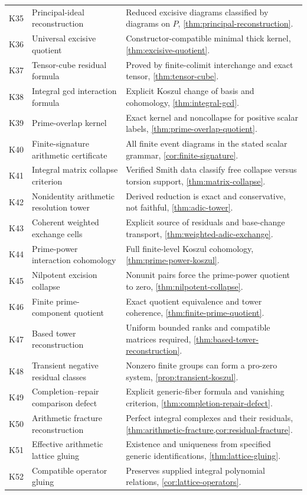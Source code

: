 \documentclass[11pt]{article}
\theoremstyle{definition}
\theoremstyle{remark}
\begin{document}
\begin{longtable}{>{\raggedright\arraybackslash}p{} >{\raggedright\arraybackslash}p{} >{\raggedright\arraybackslash}p{}}
K35 & Principal-ideal reconstruction & Reduced excisive diagrams classified by diagrams on $P$, \cref{thm:principal-reconstruction}.\\
K36 & Universal excisive quotient & Constructor-compatible minimal thick kernel, \cref{thm:excisive-quotient}.\\
K37 & Tensor-cube residual formula & Proved by finite-colimit interchange and exact tensor, \cref{thm:tensor-cube}.\\
K38 & Integral gcd interaction formula & Explicit Koszul change of basis and cohomology, \cref{thm:integral-gcd}.\\
K39 & Prime-overlap kernel & Exact kernel and noncollapse for positive scalar labels, \cref{thm:prime-overlap-quotient}.\\
K40 & Finite-signature arithmetic certificate & All finite event diagrams in the stated scalar grammar, \cref{cor:finite-signature}.\\
K41 & Integral matrix collapse criterion & Verified Smith data classify free collapse versus torsion support, \cref{thm:matrix-collapse}.\\
K42 & Nonidentity arithmetic resolution tower & Derived reduction is exact and conservative, not faithful, \cref{thm:adic-tower}.\\
K43 & Coherent weighted exchange cells & Explicit source of residuals and base-change transport, \cref{thm:weighted-adic-exchange}.\\
K44 & Prime-power interaction cohomology & Full finite-level Koszul cohomology, \cref{thm:prime-power-koszul}.\\
K45 & Nilpotent excision collapse & Nonunit pairs force the prime-power quotient to zero, \cref{thm:nilpotent-collapse}.\\
K46 & Finite prime-component quotient & Exact quotient equivalence and tower coherence, \cref{thm:finite-prime-quotient}.\\
K47 & Based tower reconstruction & Uniform bounded ranks and compatible matrices required, \cref{thm:based-tower-reconstruction}.\\
K48 & Transient negative residual classes & Nonzero finite groups can form a pro-zero system, \cref{prop:transient-koszul}.\\
K49 & Completion--repair comparison defect & Explicit generic-fiber formula and vanishing criterion, \cref{thm:completion-repair-defect}.\\
K50 & Arithmetic fracture reconstruction & Perfect integral complexes and their residuals, \cref{thm:arithmetic-fracture,cor:residual-fracture}.\\
K51 & Effective arithmetic lattice gluing & Existence and uniqueness from specified generic identifications, \cref{thm:lattice-gluing}.\\
K52 & Compatible operator gluing & Preserves supplied integral polynomial relations, \cref{cor:lattice-operators}.\\
\bottomrule
\end{longtable}
\end{document}
